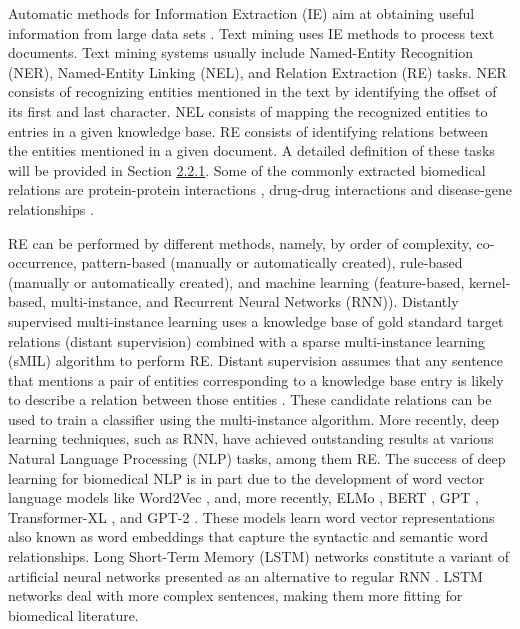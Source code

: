 Automatic methods for Information Extraction (IE) aim at obtaining useful information from large data sets \citep{REVIEW}. Text mining uses IE methods to process text documents. Text mining systems usually include Named-Entity Recognition (NER), Named-Entity Linking (NEL), and Relation Extraction (RE) tasks. NER consists of recognizing entities
mentioned in the text by identifying the offset of its first and last character. NEL consists of mapping the recognized entities to entries in a given knowledge base. RE consists of identifying relations between the entities mentioned in a given document. A detailed definition of these tasks will be provided in Section \hyperlink{2.2.1}{2.2.1}. Some of the commonly extracted biomedical relations are protein-protein interactions \citep{PROTEIN-PROTEIN}, drug-drug interactions \citep{BOLSTM} and disease-gene relationships \citep{DISEASE-GENE}.

RE can be performed by different methods, namely, by order of complexity, co-occurrence, pattern-based (manually or automatically created), rule-based (manually or automatically created), and machine learning (feature-based, kernel-based, multi-instance, and Recurrent Neural Networks (RNN)). Distantly supervised multi-instance learning uses a knowledge base of gold standard target relations (distant supervision) combined with a sparse multi-instance learning (sMIL) algorithm  \citep{Bunescu:2007:MIL:1273496.1273510} to perform RE. Distant supervision assumes that any sentence that mentions a pair of entities corresponding to a knowledge base entry is likely to describe a relation between those entities \citep{10.1371/journal.pone.0171929}. These candidate relations can be used to train a classifier using the multi-instance algorithm. More recently, deep learning techniques, such as RNN, have achieved outstanding results at various Natural Language Processing (NLP) tasks, among them RE. The success of deep learning for biomedical NLP is in part due to the development of word vector language models like Word2Vec \citep{Mikolov:2013:DRW:2999792.2999959}, and, more recently, ELMo \citep{DBLP:journals/corr/abs-1802-05365}, BERT \citep{BERT}, GPT \citep{Radford2018ImprovingLU}, Transformer-XL \citep{2019arXiv190102860D}, and GPT-2 \citep{gt2}. These models learn word vector representations also known as word embeddings that capture the syntactic and semantic word relationships. Long Short-Term Memory (LSTM) networks constitute a variant of artificial neural networks presented as an alternative to regular RNN \citep{Hochreiter:1997:LSM:1246443.1246450}. LSTM networks deal with more complex sentences, making them more fitting for biomedical literature. %

